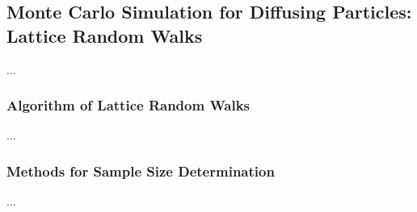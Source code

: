 \subsection{Monte Carlo Simulation for Diffusing Particles: Lattice Random Walks}


...


\subsubsection{Algorithm of Lattice Random Walks}


...


\subsubsection{Methods for Sample Size Determination}


...




